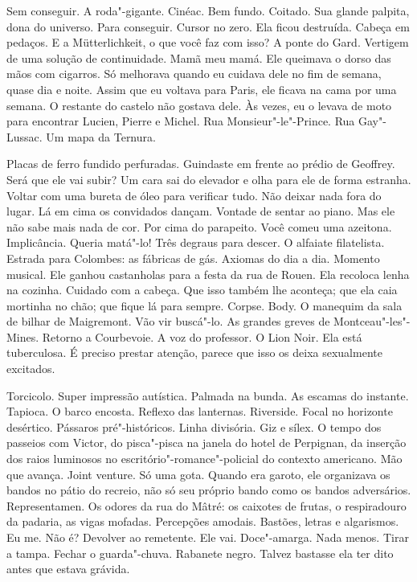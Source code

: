 Sem conseguir. A roda"-gigante. Cinéac. Bem fundo. Coitado. Sua glande
palpita, dona do universo. Para conseguir. Cursor no zero. Ela ficou
destruída. Cabeça em pedaços. E a Mütterlichkeit, o que você faz com
isso? A ponte do Gard. Vertigem de uma solução de continuidade. Mamã meu
mamá. Ele queimava o dorso das mãos com cigarros. Só melhorava quando eu
cuidava dele no fim de semana, quase dia e noite. Assim que eu voltava
para Paris, ele ficava na cama por uma semana. O restante do castelo não
gostava dele. Às vezes, eu o levava de moto para encontrar Lucien,
Pierre e Michel. Rua Monsieur"-le"-Prince. Rua Gay"-Lussac. Um mapa da
Ternura.

Placas de ferro fundido perfuradas. Guindaste em frente ao prédio de
Geoffrey. Será que ele vai subir? Um cara sai do elevador e olha para
ele de forma estranha. Voltar com uma bureta de óleo para verificar
tudo. Não deixar nada fora do lugar. Lá em cima os convidados dançam.
Vontade de sentar ao piano. Mas ele não sabe mais nada de cor. Por cima
do parapeito. Você comeu uma azeitona. Implicância. Queria matá"-lo! Três
degraus para descer. O alfaiate filatelista. Estrada para Colombes: as
fábricas de gás. Axiomas do dia a dia. Momento musical. Ele ganhou
castanholas para a festa da rua de Rouen. Ela recoloca lenha na cozinha.
Cuidado com a cabeça. Que isso também lhe aconteça; que ela caia
mortinha no chão; que fique lá para sempre. Corpse. Body. O manequim da %
sala de bilhar de Maigremont. Vão vir buscá"-lo. As grandes greves de
Montceau"-les"-Mines. Retorno a Courbevoie. A voz do professor. O Lion
Noir. Ela está tuberculosa. É preciso prestar atenção, parece que isso
os deixa sexualmente excitados.

Torcicolo. Super impressão autística. Palmada na bunda. As escamas do
instante. Tapioca. O barco encosta. Reflexo das lanternas. Riverside.
Focal no horizonte desértico. Pássaros pré"-históricos. Linha divisória.
Giz e sílex. O tempo dos passeios com Victor, do pisca"-pisca na janela
do hotel de Perpignan, da inserção dos raios luminosos no
escritório"-romance"-policial do contexto americano. Mão que avança. Joint
venture. Só uma gota. Quando era garoto, ele organizava os bandos no
pátio do recreio, não só seu próprio bando como os bandos adversários.
Representamen. Os odores da rua do Mâtré: os caixotes de frutas, o
respiradouro da padaria, as vigas mofadas. Percepções amodais. Bastões,
letras e algarismos. Eu me. Não é? Devolver ao remetente. Ele vai.
Doce"-amarga. Nada menos. Tirar a tampa. Fechar o guarda"-chuva. Rabanete
negro. Talvez bastasse ela ter dito antes que estava grávida.

